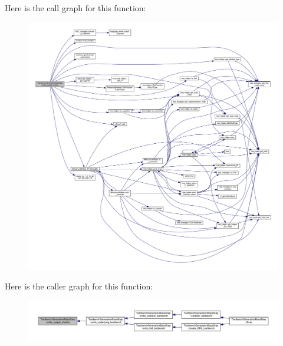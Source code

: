 Here is the call graph for this function\+:
\nopagebreak
\begin{figure}[H]
\begin{center}
\leavevmode
\includegraphics[width=350pt]{dc/d02/classTestbenchGenerationBaseStep_a4739acf051dcddc240eee6d1a4719308_cgraph}
\end{center}
\end{figure}
Here is the caller graph for this function\+:
\nopagebreak
\begin{figure}[H]
\begin{center}
\leavevmode
\includegraphics[width=350pt]{dc/d02/classTestbenchGenerationBaseStep_a4739acf051dcddc240eee6d1a4719308_icgraph}
\end{center}
\end{figure}
\mbox{\label{classTestbenchGenerationBaseStep_af4bf6836e809359aa23a892ea16c08df}} 

